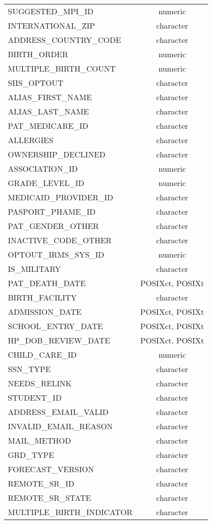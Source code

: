 \documentclass[
  letterpaper,
  DIV=11,
  numbers=noendperiod]{scrreprt}
\begin{document}
\begin{longtable}{lc}
SUGGESTED\_MPI\_ID & numeric \\ 
INTERNATIONAL\_ZIP & character \\ 
ADDRESS\_COUNTRY\_CODE & character \\ 
BIRTH\_ORDER & numeric \\ 
MULTIPLE\_BIRTH\_COUNT & numeric \\ 
SIIS\_OPTOUT & character \\ 
ALIAS\_FIRST\_NAME & character \\ 
ALIAS\_LAST\_NAME & character \\ 
PAT\_MEDICARE\_ID & character \\ 
ALLERGIES & character \\ 
OWNERSHIP\_DECLINED & character \\ 
ASSOCIATION\_ID & numeric \\ 
GRADE\_LEVEL\_ID & numeric \\ 
MEDICAID\_PROVIDER\_ID & character \\ 
PASPORT\_PHAME\_ID & character \\ 
PAT\_GENDER\_OTHER & character \\ 
INACTIVE\_CODE\_OTHER & character \\ 
OPTOUT\_IRMS\_SYS\_ID & numeric \\ 
IS\_MILITARY & character \\ 
PAT\_DEATH\_DATE & POSIXct, POSIXt \\ 
BIRTH\_FACILITY & character \\ 
ADMISSION\_DATE & POSIXct, POSIXt \\ 
SCHOOL\_ENTRY\_DATE & POSIXct, POSIXt \\ 
HP\_DOB\_REVIEW\_DATE & POSIXct, POSIXt \\ 
CHILD\_CARE\_ID & numeric \\ 
SSN\_TYPE & character \\ 
NEEDS\_RELINK & character \\ 
STUDENT\_ID & character \\ 
ADDRESS\_EMAIL\_VALID & character \\ 
INVALID\_EMAIL\_REASON & character \\ 
MAIL\_METHOD & character \\ 
GRD\_TYPE & character \\ 
FORECAST\_VERSION & character \\ 
REMOTE\_SR\_ID & character \\ 
REMOTE\_SR\_STATE & character \\ 
MULTIPLE\_BIRTH\_INDICATOR & character \\ 

\end{longtable}
\end{document}
